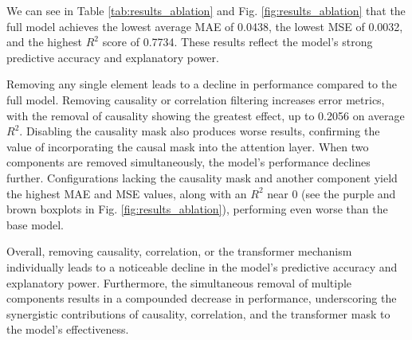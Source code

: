 \documentclass[acmsmall]{acmart}
\begin{document}
We can see in Table \ref{tab:results_ablation} and Fig. \ref{fig:results_ablation} that the full model achieves the lowest average MAE of 0.0438, the lowest MSE of 0.0032, and the highest $R^2$ score of 0.7734. These results reflect the model’s strong predictive accuracy and explanatory power.

Removing any single element leads to a decline in performance compared to the full model. Removing causality or correlation filtering increases error metrics, with the removal of causality showing the greatest effect, up to 0.2056 on average $R^2$. Disabling the causality mask also produces worse results, confirming the value of incorporating the causal mask into the attention layer. When two components are removed simultaneously, the model’s performance declines further. Configurations lacking the causality mask and another component yield the highest MAE and MSE values, along with an $R^2$ near 0 (see the purple and brown boxplots in Fig. \ref{fig:results_ablation}), performing even worse than the base model.

Overall, removing causality, correlation, or the transformer mechanism individually leads to a noticeable decline in the model's predictive accuracy and explanatory power. Furthermore, the simultaneous removal of multiple components results in a compounded decrease in performance, underscoring the synergistic contributions of causality, correlation, and the transformer mask to the model's effectiveness. %
\end{document}
